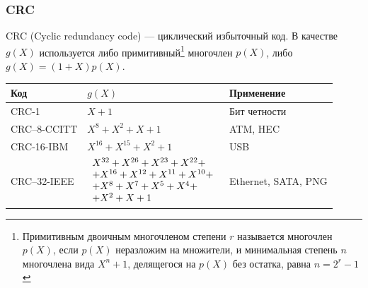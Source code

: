 \begin{frame}
    \frametitle{CRC}

    CRC (Cyclic redundancy code) --- циклический избыточный код. В качестве $g(X)$ используется либо \alert{примитивный}\footnote{Примитивным двоичным многочленом степени $r$ называется многочлен $p(X)$, если $p(X)$ неразложим на множители, и минимальная степень $n$ многочлена вида $X^n+1$, делящегося на $p(X)$ без остатка, равна $n=2^r-1$} многочлен $p(X)$, либо $g(X)=(1+X)p(X)$.

    \begin{table}[ht]
        \centering
        \begin{tabular}[c]{|l|l|l|}
            \hline\hline
            Код                 &$g(X)$                         & Применение\\
            \hline\hline
            CRC-1               &$X+1$                          & Бит четности\\
            \hline
            CRC--8-CCITT        &$X^8 + X^2 + X + 1$            & ATM, HEC\\
            \hline
            CRC-16-IBM          &$X^{16} + X^{15} + X^2 + 1$    & USB\\
            \hline
            CRC--32-IEEE        &$
                                    \begin{array}[l]{l}
                                      X^{32} + X^{26} + X^{23} + X^{22} + \\
                                    + X^{16} + X^{12} + X^{11} + X^{10} + \\
                                    + X^8    + X^7    + X^5    + X^4    +\\
                                    + X^2    + X      + 1
                                    \end{array}
                                 $                                  
                                                                & Ethernet, SATA, PNG\\
            \hline
        \end{tabular}
    \end{table}
\end{frame}


